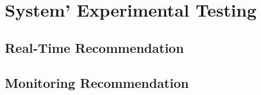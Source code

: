 \chapter{System' Experimental Testing}

\section{Real-Time Recommendation}
\subsection{}
\subsection{}

\section{Monitoring Recommendation}
\subsection{}
\subsection{}


